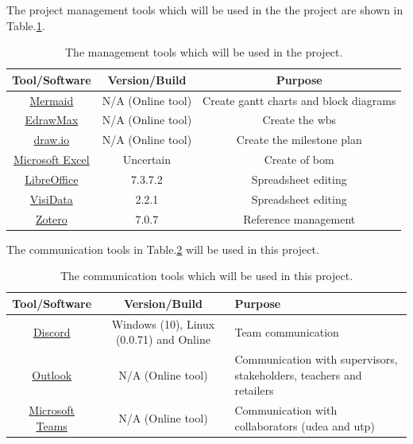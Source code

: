 The project management tools which will be used in the the project are shown in Table.\:\ref{tab:management_tools}.
\begin{table}[H]
    \centering
    \caption{The management tools which will be used in the project.}
    \label{tab:management_tools}
    \begin{tabular}{|c|c|c|} \hline
         \textbf{Tool/Software} & \textbf{Version/Build} & \textbf{Purpose} \\ \hline
         \href{https://mermaid.js.org/}{Mermaid} & N/A (Online tool) & Create gantt charts and block diagrams \\ \hline
         \href{https://www.edrawmax.com/}{EdrawMax} & N/A (Online tool) & Create the \ac{wbs} \\ \hline
         \href{https://www.drawio.com/}{draw.io} & N/A (Online tool) & Create the milestone plan \\ \hline
         \href{https://www.microsoft.com/en-us/microsoft-365/excel}{Microsoft Excel} & Uncertain & Create of \ac{bom} \\ \hline
         \href{https://www.libreoffice.org/}{LibreOffice} & 7.3.7.2 & Spreadsheet editing \\ \hline
         \href{https://www.visidata.org/}{VisiData} & 2.2.1 & Spreadsheet editing \\ \hline
         \href{https://www.zotero.org/}{Zotero} & 7.0.7 & Reference management \\ \hline
    \end{tabular}
\end{table}

The communication tools in Table.\:\ref{tab:communication_tools} will be used in this project.
\begin{table}[H]
    \centering
    \caption{The communication tools which will be used in this project.}
    \label{tab:communication_tools}
    \begin{tabularx}{\textwidth}{|c|c|X|} \hline
         \textbf{Tool/Software} & \textbf{Version/Build} & \textbf{Purpose} \\ \hline
         \href{https://discord.com/}{Discord} & Windows (10), Linux (0.0.71) and Online & Team communication \\ \hline
         \href{https://www.microsoft.com/en-us/microsoft-365/outlook/email-and-calendar-software-microsoft-outlook}{Outlook} & N/A (Online tool) & Communication with supervisors, stakeholders, teachers and retailers \\ \hline
         \href{https://www.microsoft.com/en-us/microsoft-teams/log-in}{Microsoft Teams} & N/A (Online tool) & Communication with collaborators (\ac{udea} and \ac{utp}) \\ \hline
    \end{tabularx}
\end{table}

